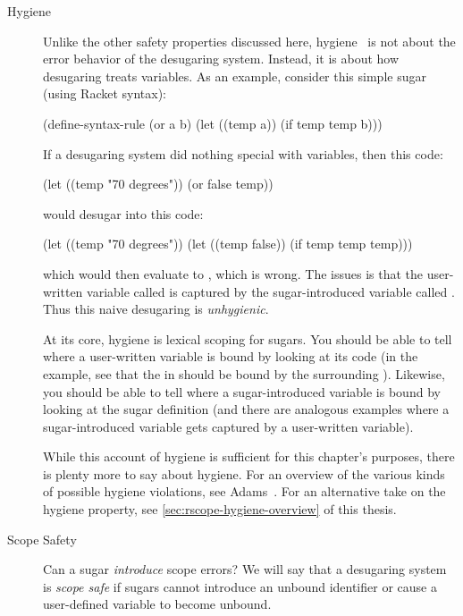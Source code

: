 \begin{description}
  \item[Hygiene] Unlike the other safety properties discussed here,
    hygiene~\cite{hygienic-macros} is not about the error behavior of the desugaring
    system.  Instead, it is about how desugaring treats variables. As
    an example, consider this simple  sugar (using Racket
    syntax):
\begin{CorrectlyIndentedCodes}
(define-syntax-rule
  (or a b)
  (let ((temp a)) (if temp temp b)))
\end{CorrectlyIndentedCodes}
    If a desugaring system did nothing special with variables, then
    this code:
\begin{CorrectlyIndentedCodes}
(let ((temp "70 degrees"))
  (or false temp))
\end{CorrectlyIndentedCodes}
    would desugar into this code:
\begin{CorrectlyIndentedCodes}
(let ((temp "70 degrees"))
  (let ((temp false)) (if temp temp temp)))
\end{CorrectlyIndentedCodes}
    which would then evaluate to , which is wrong. The
    issues is that the user-written variable called  is
    captured by the sugar-introduced variable called .
    Thus this naive desugaring is \emph{unhygienic}.
    
    At its core, hygiene is lexical scoping for sugars. You should be
    able to tell where a user-written variable is bound by looking at
    its code (in the example, see that the  in  should be bound by the surrounding ).
    Likewise,
    you should be able to tell where a sugar-introduced variable is
    bound by looking at the sugar definition (and there are analogous
    examples where a sugar-introduced variable gets captured by a
    user-written variable).

    While this account of hygiene is sufficient for this chapter's
    purposes, there is plenty more to say about hygiene. For an
    overview of the various kinds of possible hygiene violations, see
    Adams~\cite{adams-hygiene}. For an alternative take on the hygiene
    property, see \cref{sec:rscope-hygiene-overview} of this thesis.
    
  \item[Scope Safety] Can a sugar \emph{introduce} scope errors?  We
    will say that a desugaring system is \emph{scope safe} if sugars
    cannot introduce an unbound identifier or cause a user-defined
    variable to become unbound.


\end{description}
